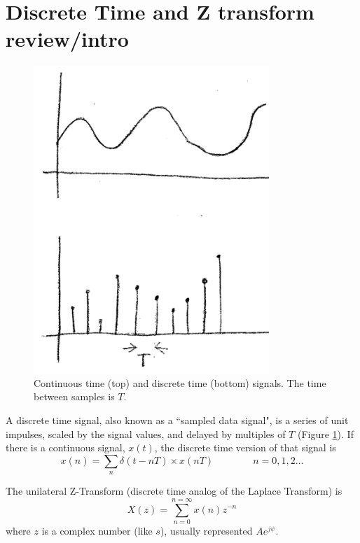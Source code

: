 \section{Discrete Time and Z transform review/intro}

\begin{figure}[h]
\includegraphics[width=3.5in]{figs11/cont_disc_sigsa.png}	%
\caption{Continuous time (top) and discrete time (bottom) signals. The time between samples is $T$.}\label{FigContinuousDiscreteSignals}
\end{figure} 


A discrete time signal, also known as a ``sampled data signal", is a series of unit impulses,
scaled by the signal values, and delayed by multiples of $T$ (Figure \ref{FigContinuousDiscreteSignals}).  
If there is a continuous signal, $x(t)$, the discrete time version of that signal is
\[
x(n) = \sum_n \delta(t-nT)\times x(nT)  \qquad \qquad n = 0,1,2 \dots
\]

The unilateral Z-Transform (discrete time analog of the Laplace Transform) is
\[
X(z) = \sum_{n=0}^{n=\infty} x(n)z^{-n}
\]
where $z$ is a complex number (like $s$), usually represented $Ae^{j\psi}$.

